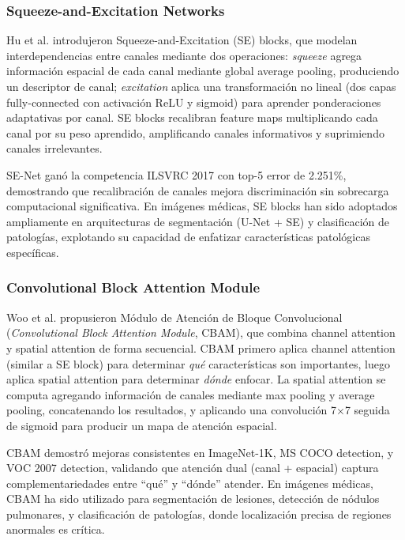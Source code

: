 \subsubsection{Squeeze-and-Excitation Networks}

Hu et al. \cite{hu2018squeeze} introdujeron Squeeze-and-Excitation (SE) blocks, que modelan interdependencias entre canales mediante dos operaciones: \textit{squeeze} agrega información espacial de cada canal mediante global average pooling, produciendo un descriptor de canal; \textit{excitation} aplica una transformación no lineal (dos capas fully-connected con activación ReLU y sigmoid) para aprender ponderaciones adaptativas por canal. SE blocks recalibran feature maps multiplicando cada canal por su peso aprendido, amplificando canales informativos y suprimiendo canales irrelevantes.

SE-Net ganó la competencia ILSVRC 2017 con top-5 error de 2.251\%, demostrando que recalibración de canales mejora discriminación sin sobrecarga computacional significativa. En imágenes médicas, SE blocks han sido adoptados ampliamente en arquitecturas de segmentación (U-Net + SE) y clasificación de patologías, explotando su capacidad de enfatizar características patológicas específicas.

\subsubsection{Convolutional Block Attention Module}

Woo et al. \cite{woo2018cbam} propusieron Módulo de Atención de Bloque Convolucional (\textit{Convolutional Block Attention Module}, CBAM), que combina channel attention y spatial attention de forma secuencial. CBAM primero aplica channel attention (similar a SE block) para determinar \textit{qué} características son importantes, luego aplica spatial attention para determinar \textit{dónde} enfocar. La spatial attention se computa agregando información de canales mediante max pooling y average pooling, concatenando los resultados, y aplicando una convolución 7$\times$7 seguida de sigmoid para producir un mapa de atención espacial.

CBAM demostró mejoras consistentes en ImageNet-1K, MS COCO detection, y VOC 2007 detection, validando que atención dual (canal + espacial) captura complementariedades entre ``qué'' y ``dónde'' atender. En imágenes médicas, CBAM ha sido utilizado para segmentación de lesiones, detección de nódulos pulmonares, y clasificación de patologías, donde localización precisa de regiones anormales es crítica.

